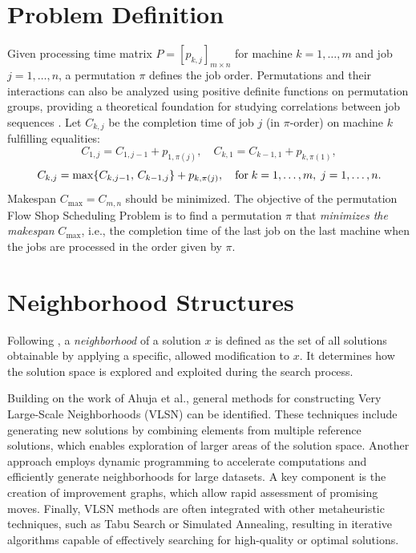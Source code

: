 \documentclass[runningheads]{llncs}
\begin{document}
\section{Problem Definition}
Given processing time matrix $P = [p_{k,j}]_{m \times n}$ for machine $k=1,\dots,m$ and job $j=1,\dots,n$, a permutation $\pi$ defines the job order. Permutations and their interactions can also be analyzed using positive definite functions on permutation groups, providing a theoretical foundation for studying correlations between job sequences \cite{Bozejko2015}. Let $C_{k,j}$ be the completion time of job $j$ (in $\pi$-order) on machine $k$ fulfilling equalities:
\[
C_{1,j} = C_{1,j-1} + p_{1,\pi(j)},\quad
C_{k,1} = C_{k-1,1} + p_{k,\pi(1)},
\]
\begin{equation}\label{eq_c_kj}
C_{k,j} = \max\{C_{k,j-1},\, C_{k-1,j}\} + p_{k,\pi(j)}, \quad {\rm for}\;k=1,\dots,m,\; j=1,\dots,n.
\end{equation}
Makespan $C_{\max} = C_{m,n}$ should be minimized. The objective of the permutation Flow Shop Scheduling Problem is to find a permutation $\pi$ that \emph{minimizes the makespan} $C_{\max}$, i.e., the completion time of the last job on the last machine
when the jobs are processed in the order given by $\pi$.

\section{Neighborhood Structures}
Following \cite{vanlaarhoven1992}, a \emph{neighborhood} of a solution $x$ is defined as the set of all solutions obtainable by applying a specific, allowed modification to $x$. It determines how the solution space is explored and exploited during the search process.

Building on the work of Ahuja et al.\cite{ahuja2002,glover1997}, general methods for constructing Very Large-Scale Neighborhoods (VLSN) can be identified. These techniques include generating new solutions by combining elements from multiple reference solutions, which enables exploration of larger areas of the solution space. Another approach employs dynamic programming to accelerate computations and efficiently generate neighborhoods for large datasets. A key component is the creation of improvement graphs, which allow rapid assessment of promising moves. Finally, VLSN methods are often integrated with other metaheuristic techniques, such as Tabu Search or Simulated Annealing, resulting in iterative algorithms capable of effectively searching for high-quality or optimal solutions.
\end{document}
